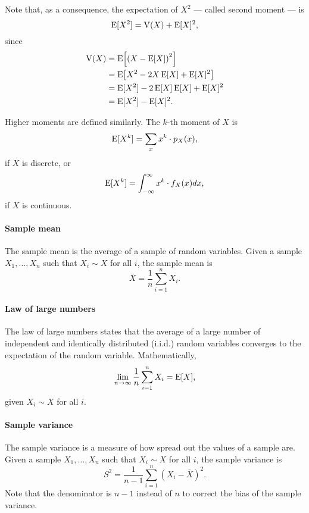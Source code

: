 Note that, as a consequence, the expectation of $X^2$ --- called second moment --- is
\[
  \operatorname{E}[X^2] = \operatorname{V}(X) + \operatorname{E}[X]^2\text{,}
\]
since
\begin{align*}
  \operatorname{V}(X)
    &= \operatorname{E}\!\left[\left(X - \operatorname{E}[X]\right)^2\right] \\
    &= \operatorname{E}\!\left[X^2 - 2 X \operatorname{E}[X] + \operatorname{E}[X]^2\right] \\
    &= \operatorname{E}[X^2] - 2 \operatorname{E}[X] \operatorname{E}[X] + \operatorname{E}[X]^2 \\
    &= \operatorname{E}[X^2] - \operatorname{E}[X]^2\text{.}
\end{align*}

Higher moments are defined similarly.  The $k$-th moment of $X$ is
\begin{equation*}
  \operatorname{E}[X^k] = \sum_{x} x^k \cdot p_X(x)\text{,}
\end{equation*}
if $X$ is discrete, or
\begin{equation*}
  \operatorname{E}[X^k] = \int_{-\infty}^{\infty} x^k \cdot f_X(x) dx\text{,}
\end{equation*}
if $X$ is continuous.

\paragraph{Sample mean}  The sample mean is the average of a sample of random variables.
Given a sample $X_1, \dots, X_n$ such that $X_i \sim X$ for all $i$, the sample mean is
\begin{equation*}
  \bar{X} = \frac{1}{n} \sum_{i = 1}^n X_i\text{.}
\end{equation*}

\paragraph{Law of large numbers}  The law of large numbers states that the average of
a large number of independent and identically distributed (i.i.d.) random variables converges
to the expectation of the random variable.  Mathematically,
\begin{equation*}
  \lim_{n \rightarrow \infty} \frac{1}{n} \sum_{i = 1}^n X_i = \operatorname{E}[X]\text{,}
\end{equation*}
given $X_i \sim X$ for all $i$.

\paragraph{Sample variance}  The sample variance is a measure of how spread out the
values of a sample are.  Given a sample $X_1, \dots, X_n$ such that $X_i \sim X$ for all
$i$, the sample variance is
\begin{equation*}
  S^2 = \frac{1}{n - 1} \sum_{i = 1}^n (X_i - \bar{X})^2\text{.}
\end{equation*}
Note that the denominator is $n - 1$ instead of $n$ to correct the bias of the sample
variance.

